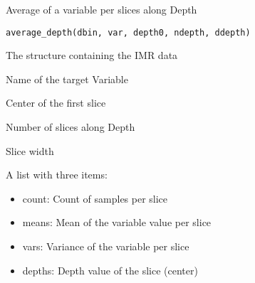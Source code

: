 %
\begin{Description}\relax
Average of a variable per slices along Depth
\end{Description}
%
\begin{Usage}
\begin{verbatim}
average_depth(dbin, var, depth0, ndepth, ddepth)
\end{verbatim}
\end{Usage}
%
\begin{Arguments}
\begin{ldescription}
\item[\code{dbin}] 
The  structure containing the IMR data

\item[\code{var}] 
Name of the target Variable

\item[\code{depth0}] 
Center of the first slice

\item[\code{ndepth}] 
Number of slices along Depth

\item[\code{ddepth}] 
Slice width

\end{ldescription}
\end{Arguments}
%
\begin{Value}
A list with three items:
\begin{itemize}

\item count: Count of samples per slice
\item means: Mean of the variable value per slice
\item vars:  Variance of the variable per slice
\item depths: Depth value of the slice (center)

\end{itemize}

\end{Value}
